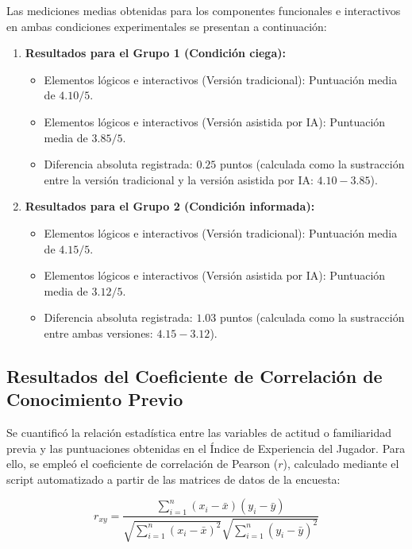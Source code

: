 Las mediciones medias obtenidas para los componentes funcionales e interactivos en ambas condiciones experimentales se presentan a continuación:

\begin{enumerate}
    \item \textbf{Resultados para el Grupo 1 (Condición ciega):}
    \begin{itemize}
        \item Elementos lógicos e interactivos (Versión tradicional): Puntuación media de $4.10/5$.
        \item Elementos lógicos e interactivos (Versión asistida por IA): Puntuación media de $3.85/5$.
        \item Diferencia absoluta registrada: $0.25$ puntos (calculada como la sustracción entre la versión tradicional y la versión asistida por IA: $4.10 - 3.85$).
    \end{itemize}
    \item \textbf{Resultados para el Grupo 2 (Condición informada):}
    \begin{itemize}
        \item Elementos lógicos e interactivos (Versión tradicional): Puntuación media de $4.15/5$.
        \item Elementos lógicos e interactivos (Versión asistida por IA): Puntuación media de $3.12/5$.
        \item Diferencia absoluta registrada: $1.03$ puntos (calculada como la sustracción entre ambas versiones: $4.15 - 3.12$).
    \end{itemize}
\end{enumerate}

\subsection{Resultados del Coeficiente de Correlación de Conocimiento Previo}

Se cuantificó la relación estadística entre las variables de actitud o familiaridad previa y las puntuaciones obtenidas en el Índice de Experiencia del Jugador. Para ello, se empleó el coeficiente de correlación de Pearson ($r$), calculado mediante el script automatizado a partir de las matrices de datos de la encuesta:

\begin{equation*}
r_{xy} = \frac{\sum_{i=1}^{n} (x_i - \bar{x})(y_i - \bar{y})}{\sqrt{\sum_{i=1}^{n} (x_i - \bar{x})^2} \sqrt{\sum_{i=1}^{n} (y_i - \bar{y})^2}}
\end{equation*}


